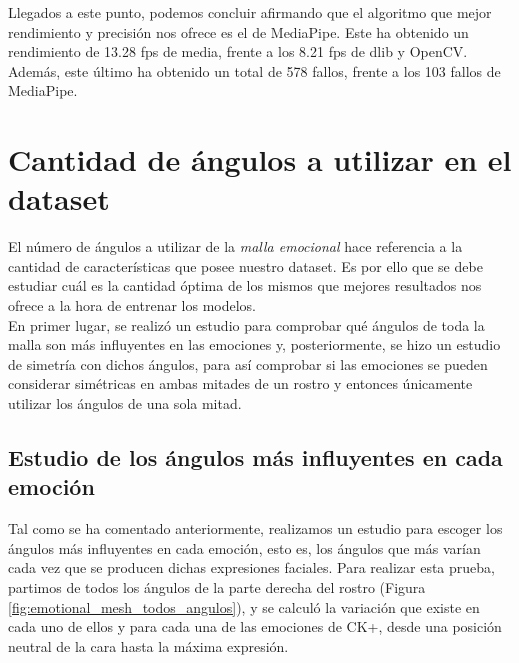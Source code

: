 Llegados a este punto, podemos concluir afirmando que el algoritmo que mejor rendimiento y precisión nos ofrece es el de MediaPipe. Este ha obtenido un rendimiento de 13.28 fps de media, frente a los 8.21 fps de dlib y OpenCV. Además, este último ha obtenido un total de 578 fallos, frente a los 103 fallos de MediaPipe.

\section{Cantidad de ángulos a utilizar en el dataset}
\label{sec:estudio_cantidad_de_angulos}

El número de ángulos a utilizar de la \textit{malla emocional} hace referencia a la cantidad de características que posee nuestro dataset. Es por ello que se debe estudiar cuál es la cantidad óptima de los mismos que mejores resultados nos ofrece a la hora de entrenar los modelos.\\

En primer lugar, se realizó un estudio para comprobar qué ángulos de toda la malla son más influyentes en las emociones y, posteriormente, se hizo un estudio de simetría con dichos ángulos, para así comprobar si las emociones se pueden considerar simétricas en ambas mitades de un rostro y entonces únicamente utilizar los ángulos de una sola mitad.

\subsection{Estudio de los ángulos más influyentes en cada emoción}

Tal como se ha comentado anteriormente, realizamos un estudio para escoger los ángulos más influyentes en cada emoción, esto es, los ángulos que más varían cada vez que se producen dichas expresiones faciales. Para realizar esta prueba, partimos de todos los ángulos de la parte derecha del rostro (Figura \ref{fig:emotional_mesh_todos_angulos}), y se calculó la variación que existe en cada uno de ellos y para cada una de las emociones de CK+, desde una posición neutral de la cara hasta la máxima expresión.\\

